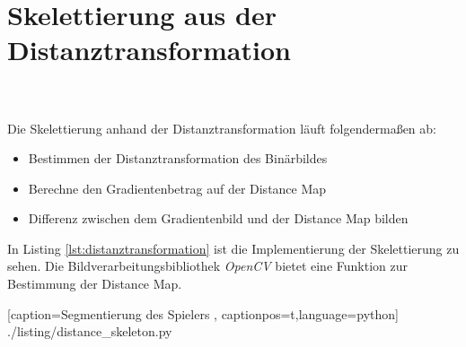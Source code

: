 \section{Skelettierung aus der Distanztransformation}
\\\\
Die Skelettierung anhand der Distanztransformation läuft folgendermaßen ab:
\begin{itemize}
\item Bestimmen der Distanztransformation des Binärbildes
\item Berechne den Gradientenbetrag auf der Distance Map
\item Differenz zwischen dem Gradientenbild und der Distance Map bilden
\end{itemize}
In Listing \ref*{lst:distanztransformation} ist die Implementierung der Skelettierung zu sehen.
Die Bildverarbeitungsbibliothek \emph{OpenCV} bietet eine Funktion zur Bestimmung der Distance Map.

    [caption={Segmentierung des Spielers}
       \label{lst:distanztransformation},
       captionpos=t,language=python]
 {./listing/distance_skeleton.py} 